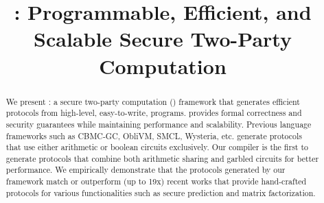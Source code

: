 \documentclass[conference,compsoc]{IEEEtran}
\begin{document}
\title{\tool: Programmable, Efficient, and Scalable Secure Two-Party Computation}





\maketitle
\begin{abstract}

We present \tool: a 
secure two-party computation (\mpc) framework that generates efficient
\mpc protocols from high-level, easy-to-write, programs.
\tool provides formal correctness and security guarantees while maintaining performance and scalability.
Previous language frameworks such as CBMC-GC, ObliVM, SMCL, Wysteria, etc. generate protocols that use either arithmetic or boolean circuits exclusively. Our compiler is the first to generate protocols that combine both arithmetic sharing and garbled circuits  for better performance.
We
empirically demonstrate that the
protocols generated by our framework match or outperform (up to
19x)
recent works that provide hand-crafted protocols for various
functionalities such as secure  prediction  and matrix factorization.
\end{abstract}
\IEEEpeerreviewmaketitle
\end{document}
